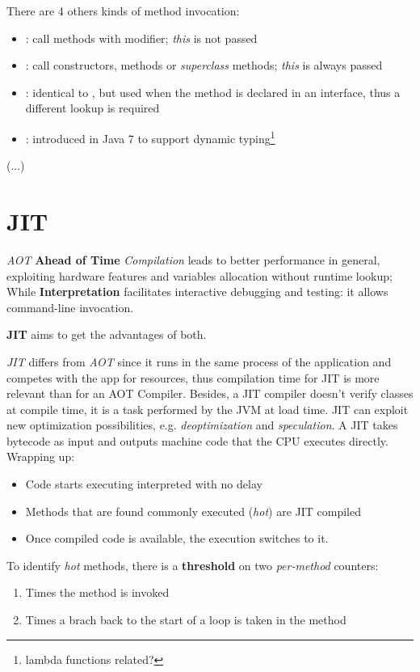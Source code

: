 There are 4 others kinds of method invocation:
\begin{itemize}
    \item {}: call methods with  modifier; \textit{this} is not passed
    \item {}: call constructors,  methods or \textit{superclass} methods; \textit{this} is always passed 
    \item {}: identical to , but used when the method is declared in an interface, thus a different lookup is required
    \item {}: introduced in Java 7 to support dynamic typing\footnote{lambda functions related?}
\end{itemize}

(...)

\section{JIT}
\textit{AOT} \textbf{Ahead of Time} \textit{Compilation} leads to better performance in general, exploiting hardware features and variables allocation without runtime lookup;
While \textbf{Interpretation} facilitates interactive debugging and testing: it allows command-line invocation.

\textbf{JIT} aims to get the advantages of both.

\textit{JIT} differs from \textit{AOT} since it runs in the same process of the application and competes with the app for resources,
thus compilation time for JIT is more relevant than for an AOT Compiler.
Besides, a JIT compiler doesn't verify classes at compile time, it is a task performed by the JVM at load time. 
JIT can exploit new optimization possibilities, e.g. \textit{deoptimization} and \textit{speculation}.
A JIT takes bytecode as input and outputs machine code that the CPU executes directly.\\
Wrapping up:
\begin{itemize}
    \item Code starts executing interpreted with no delay
    \item Methods that are found commonly executed (\textit{hot}) are JIT compiled
    \item Once compiled code is available, the execution switches to it.
\end{itemize}

To identify \textit{hot} methods, there is a \textbf{threshold} on two \textit{per-method} counters:
\begin{enumerate}
    \item Times the method is invoked
    \item Times a brach back to the start of a loop is taken in the method
\end{enumerate}

